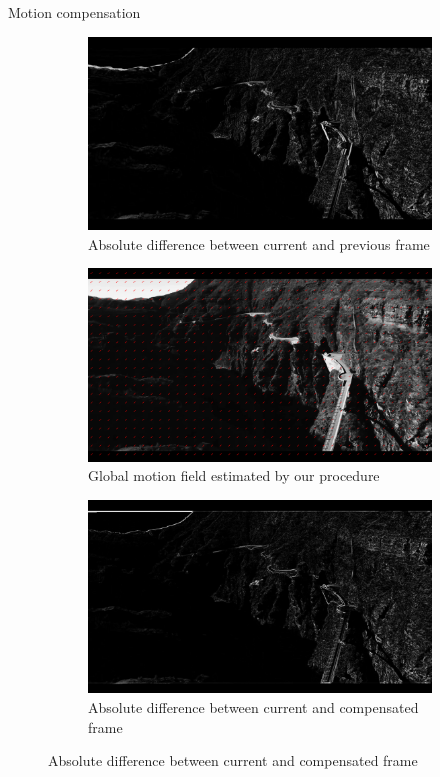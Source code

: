 \documentclass[aspectratio=1610,xcolor=dvipsnames]{beamer}
\begin{document}
\begin{frame}{Motion compensation}
\begin{figure}[htbp]
        \begin{subfigure}[b]{0.3\textwidth}
            \centering
            \includegraphics[width=\textwidth]{images/bird-curr_prev_diff.png}
            \caption{Absolute difference between current and previous frame}
            \label{fig:bird-diff-curr-prev}
        \end{subfigure}
        \hfill
        \begin{subfigure}[b]{0.3\textwidth}
            \includegraphics[width=\textwidth]{images/bird-model_motion_field.png}
            \caption{Global motion field estimated by our procedure}
            \label{fig:bird-est-mf}
        \end{subfigure}
        \hfill
        \begin{subfigure}[b]{0.3\textwidth}
            \includegraphics[width=\textwidth]{images/bird-curr_comp_diff.png}
            \caption{Absolute difference between current and compensated frame}
            \label{fig:bird-diff-curr-comp}
        \end{subfigure}
    

\end{figure}
\end{frame}
\end{document}
